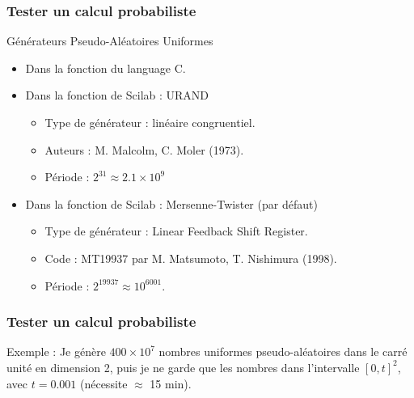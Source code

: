 \documentclass{beamer}
\begin{document}

\begin{frame}
\frametitle{Tester un calcul probabiliste}
Générateurs Pseudo-Aléatoires Uniformes
\begin{itemize}
\item Dans la fonction  du language C.
\item Dans la fonction  de Scilab : URAND
    \begin{itemize}
    \item Type de générateur : linéaire congruentiel.
	\item Auteurs : M. Malcolm, C. Moler (1973).
	\item Période : $2^{31}\approx 2.1\times 10^9$
    \end{itemize}  
\item Dans la fonction  
de Scilab : Mersenne-Twister (par défaut)
    \begin{itemize}
    \item Type de générateur : Linear Feedback Shift Register.
    \item Code : MT19937 par M. Matsumoto, T. Nishimura (1998).
    \item Période : $2^{19937}\approx 10^{6001}$.
    \end{itemize}
\end{itemize}
\end{frame}

\begin{frame}[containsverbatim]
\frametitle{Tester un calcul probabiliste}

Exemple : 
Je génère $400\times 10^7$ nombres uniformes pseudo-aléatoires 
dans le carré unité en dimension 2, puis je ne garde 
que les nombres dans l'intervalle $[0,t]^2$, avec $t=0.001$ 
(nécessite $\approx$ 15 min). 

\end{frame}
\end{document}
